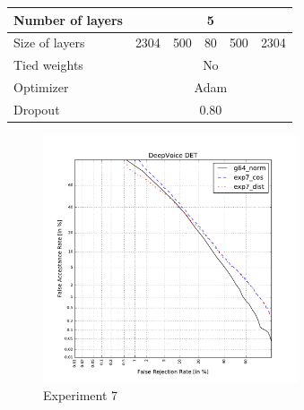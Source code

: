 \documentclass[conference]{IEEEtran}
\begin{document}




\begin{table}[!h]
\centering
\begin{tabular}{|l|c|c|c|c|c|}
\hline
Number of layers & \multicolumn{5}{c|}{5}                \\ \hline
Size of layers   & 2304   & 500   & 80  & 500  & 2304   \\ \hline
Tied weights     & \multicolumn{5}{c|}{No}               \\ \hline
Optimizer        & \multicolumn{5}{c|}{Adam} \\ \hline
Dropout          & \multicolumn{5}{c|}{0.80} \\ \hline
\end{tabular}
\end{table}


\begin{figure}[!h]
    \centering
    \includegraphics[width=7.5cm]{../scores/det7.pdf}
    \captionsetup{labelformat=empty}
    \caption{Experiment 7}
\end{figure}
\end{document}
